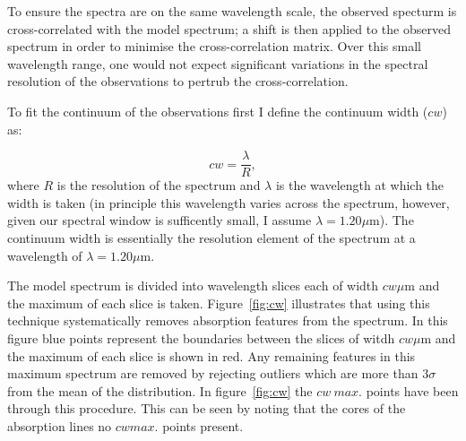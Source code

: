 \documentclass[12pt]{article}
\begin{document}
To ensure the spectra are on the same wavelength scale, the observed specturm is cross-correlated with the model spectrum;
a shift is then applied to the observed spectrum in order to minimise the cross-correlation matrix.
Over this small wavelength range, one would not expect significant variations in the spectral resolution of the observations to pertrub the cross-correlation.


To fit the continuum of the observations first I define the continuum width ($cw$) as:

\begin{equation}
    cw = \frac{\lambda}{R}, %
\end{equation}
\noindent where $R$ is the resolution of the spectrum and
$\lambda$ is the wavelength at which the width is taken
(in principle this wavelength varies across the spectrum, however, given our spectral window is sufficently small, I assume $\lambda = 1.20\mu$m).
The continuum width is essentially the resolution element of the spectrum at a wavelength of $\lambda = 1.20\mu$m.

The model spectrum is divided into wavelength slices each of width $cw\mu$m and the maximum of each slice is taken.
Figure~\ref{fig:cw} illustrates that using this technique systematically removes absorption features from the spectrum.
In this figure blue points represent the boundaries between the slices of witdh $cw\mu$m and the maximum of each slice is shown in red.
Any remaining features in this maximum spectrum are removed by rejecting outliers which are more than 3$\sigma$ from the mean of the distribution.
In figure~\ref{fig:cw} the $cw~max.$ points have been through this procedure.
This can be seen by noting that the cores of the absorption lines no $cw max.$
points present.
\end{document}
